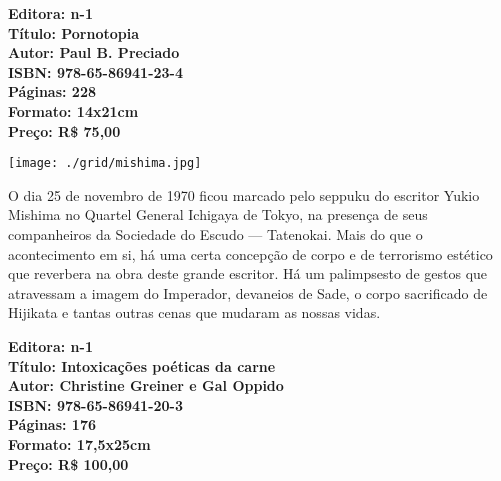 \vfill

\hspace*{-.4cm}\begin{minipage}[c]{1\linewidth}
\small\textbf{
\hspace*{-.1cm}Editora: n-1\\
Título: Pornotopia\\
Autor: Paul B. Preciado\\ 
ISBN: 978-65-86941-23-4\\
Páginas: 228\\
Formato: 14x21cm\\
Preço: R\$ 75,00\\
}
\end{minipage}

\pagebreak %


\begin{center}
\hspace*{-3.6cm}
\hspace*{3.1cm}\texttt{[image: ./grid/mishima.jpg]}
\end{center}

\hspace*{-7cm}\hrulefill\hspace*{-7cm}

\medskip

\noindent{}O dia 25 de novembro de 1970 ficou marcado pelo seppuku do escritor Yukio Mishima no Quartel General Ichigaya de Tokyo, na presença de seus companheiros da Sociedade do Escudo --- Tatenokai. Mais do que o acontecimento em si, há uma certa concepção de corpo e de terrorismo estético que reverbera na obra deste grande escritor.  Há um palimpsesto de gestos que atravessam a imagem do Imperador, devaneios de Sade, o corpo sacrificado de Hijikata e tantas outras cenas que mudaram as nossas vidas.

\vfill

\hspace*{-.4cm}\begin{minipage}[c]{.8\linewidth}
\small\textbf{
\hspace*{-.1cm}Editora: n-1\\
Título: Intoxicações poéticas da carne\\
Autor: Christine Greiner e Gal Oppido\\ 
ISBN: 978-65-86941-20-3\\
Páginas: 176\\
Formato: 17,5x25cm\\
Preço: R\$ 100,00\\
}
\end{minipage}

